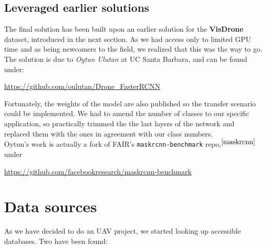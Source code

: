 \documentclass{article}
\begin{document}
\subsection{Leveraged earlier solutions}

The final solution has been built upon an earlier solution for the \textbf{VisDrone} dataset, introduced in the next section. As we had access only to limited GPU time and as being newcomers to the field, we realized that this was the way to go. The solution is due to  \textit{Oytun Ulutan} at UC Santa Barbara, and can be found under: 

\url{https://github.com/oulutan/Drone_FasterRCNN}

Fortunately, the weights of the model are also published so the transfer scenario could be implemented. We had to amend the number of classes to our specific application, so practically trimmed the the last layers of the network and replaced them with the ones in agreement with our class numbers.\\

Oytun's work is actually a fork of FAIR's \verb|maskrcnn-benchmark| repo,$^{\cite{maskrcnn}}$ under

\url{https://github.com/facebookresearch/maskrcnn-benchmark}



\section{Data sources}

As we have decided to do an UAV project, we started looking up accessible databases. Two have been found:
\end{document}
